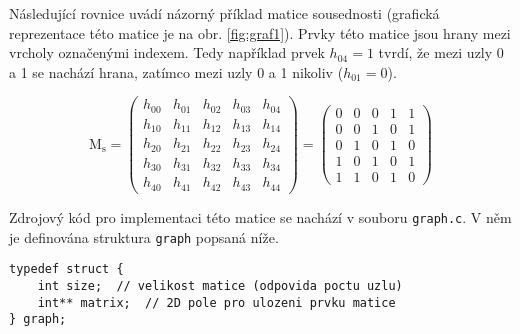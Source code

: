 \documentclass[a4paper]{article}
\begin{document}
        \noindent
        Následující rovnice uvádí názorný příklad matice sousednosti (grafická reprezentace této matice je na obr. \ref{fig:graf1}). Prvky této matice jsou hrany mezi vrcholy označenými indexem. Tedy například prvek $h_{04} = 1$ tvrdí, že mezi uzly 0 a 1 se nachází hrana, zatímco mezi uzly 0 a 1 nikoliv ($h_{01} = 0$).

        \begin{equation} \label{eq:adj-mat}
            \mathrm{M_s} = 
            \begin{pmatrix}
                h_{00} & h_{01} & h_{02} & h_{03} & h_{04} \\
                h_{10} & h_{11} & h_{12} & h_{13} & h_{14} \\
                h_{20} & h_{21} & h_{22} & h_{23} & h_{24} \\
                h_{30} & h_{31} & h_{32} & h_{33} & h_{34} \\
                h_{40} & h_{41} & h_{42} & h_{43} & h_{44}
            \end{pmatrix} = 
            \begin{pmatrix}
                0 & 0 & 0 & 1 & 1 \\
                0 & 0 & 1 & 0 & 1 \\
                0 & 1 & 0 & 1 & 0 \\
                1 & 0 & 1 & 0 & 1 \\
                1 & 1 & 0 & 1 & 0
            \end{pmatrix}
        \end{equation}

        \noindent
        Zdrojový kód pro implementaci této matice se nachází v souboru \lstinline{graph.c}. V něm je definována struktura \lstinline{graph} popsaná níže.

        \begin{lstlisting}[caption={Definice struktury neorientovaného grafu.},captionpos=b]
typedef struct {
    int size;  // velikost matice (odpovida poctu uzlu)
    int** matrix;  // 2D pole pro ulozeni prvku matice
} graph;
        \end{lstlisting}
\end{document}
